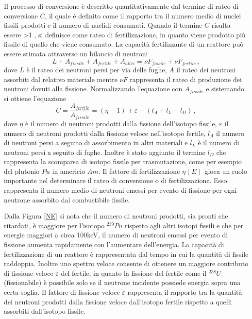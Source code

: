 Il processo di conversione è descritto quantitativamente  dal termine di 
rateo di conversione $C$, il quale è definito come il rapporto tra il numero medio 
di nuclei fissili prodotti e il numero di nuclidi consumati.
Quando il termine $C$ risulta essere >1 , si definisce come rateo di 
fertilizzazione, in quanto viene prodotto più fissile di quello che viene 
consumato.
La capacità fertilizzante di un reattore può essere stimata attraverso un 
bilancio di neutroni 
\begin{equation}
 L + A_{fissile}+A_{fertile}+A_{altri}=\nu F_{fissile} + \nu F_{fertile} \,,
\end{equation}
dove $L$ è il rateo dei neutroni persi per via delle fughe, $A$ il rateo dei neutroni 
assorbiti dal relativo materiale mentre $\nu F$ rappresenta il rateo di 
produzione dei neutroni dovuti alla fissione.
Normalizzando l'equazione con $A_{fissile}$ e sistemando si ottiene l'equazione
\begin{equation}
 C=\frac{A_{fertile}}{A_{fissile}}=(\eta-1)+\varepsilon - (l_A + l_L + l_D) \,,
\end{equation}
dove $\eta$ è il numero di neutroni prodotti dalla fissione dell'isotopo 
fissile, $\varepsilon$ il numero di neutroni prodotti dalla fissione 
veloce nell'isotopo fertile, $l_A$ il numero di neutroni persi a seguito di 
assorbimento in altri materiali e $l_L$ è il numero di neutroni persi a seguito 
di fughe. Inoltre è stato aggiunto il termine $l_D$ che rappresenta la scomparsa 
di isotopo fissile per trasmutazione, come per esempio 
del plutonio $Pu$ in americio $Am$.
Il fattore di fertilizzazione $\eta(E)$ gioca un ruolo importante nel 
determinare il rateo di conversione o di fertilizzazione. Esso rappresenta il 
numero medio di neutroni emessi per evento di fissione per ogni neutrone 
assorbito dal combustibile fissile.


Dalla Figura \ref{NE} si nota che il numero di neutroni prodotti, sia pronti 
che 
ritardati, è maggiore per l'isotopo $^{239}Pu$ rispetto agli altri isotopi 
fissili e che per energie maggiori a circa 100keV, il numero di neutroni emessi 
per evento di fissione aumenta rapidamente con l'aumentare dell'energia.
La capacità di fertilizzazione di un reattore è rappresentata dal tempo in 
cui la quantità di fissile raddoppia. 
Inoltre uno spettro veloce consente di ottenere un maggiore contributo di 
fissione veloce $\varepsilon$ del fertile, in quanto la fissione del fertile come il 
$^{238}U$ (fissionabile) è possibile solo se il neutrone incidente possiede 
energia sopra una certa soglia.
Il fattore di fissione veloce $\varepsilon$ rappresenta il rapporto tra la 
quantità dei neutroni prodotti dalla fissione veloce dall'isotopo fertile 
rispetto a quelli assorbiti dall'isotopo fissile.


